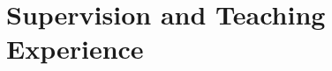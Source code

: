 \documentclass{mycv}
\begin{document}
%
%

\section{Supervision and Teaching Experience}
\end{document}

